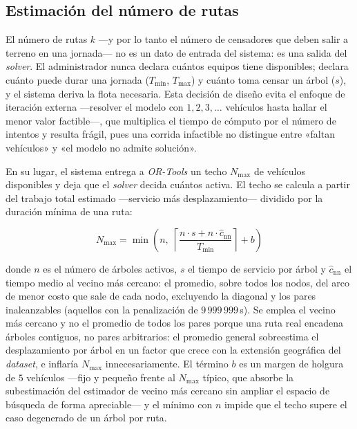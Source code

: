 \subsection{Estimación del número de rutas}

\label{sec:flota}

El número de rutas $k$ ---y por lo tanto el número de censadores que deben salir a
terreno en una jornada--- no es un dato de entrada del sistema: es una salida del
\textit{solver}. El administrador nunca declara cuántos equipos tiene disponibles; declara
cuánto puede durar una jornada ($T_{\min}$, $T_{\max}$) y cuánto toma censar un
árbol ($s$), y el sistema deriva la flota necesaria. Esta decisión de diseño evita
el enfoque de iteración externa ---resolver el modelo con $1, 2, 3, \ldots$
vehículos hasta hallar el menor valor factible---, que multiplica el tiempo de
cómputo por el número de intentos y resulta frágil, pues una corrida infactible no
distingue entre «faltan vehículos» y «el modelo no admite solución».

En su lugar, el sistema entrega a \textit{OR-Tools} un techo $N_{\max}$ de vehículos
disponibles y deja que el \textit{solver} decida cuántos activa. El techo se calcula a partir
del trabajo total estimado ---servicio más desplazamiento--- dividido por la duración
mínima de una ruta:

\begin{equation}
  N_{\max} = \min\!\left(n,\;
  \left\lceil \frac{n \cdot s + n \cdot \hat{c}_{\text{nn}}}{T_{\min}} \right\rceil + b
  \right)
  \label{eq:nmax}
\end{equation}

donde $n$ es el número de árboles activos, $s$ el tiempo de servicio por árbol y
$\hat{c}_{\text{nn}}$ el tiempo medio al vecino más cercano: el promedio,
sobre todos los nodos, del arco de menor costo que sale de cada nodo, excluyendo la
diagonal y los pares inalcanzables (aquellos con la penalización de $9\,999\,999$\,s).
Se emplea el vecino más cercano y no el promedio de todos los pares porque una ruta
real encadena árboles contiguos, no pares arbitrarios: el promedio general
sobreestima el desplazamiento por árbol en un factor que crece con la extensión
geográfica del \textit{dataset}, e inflaría $N_{\max}$ innecesariamente. El término
$b$ es un margen de holgura de $5$ vehículos ---fijo y pequeño frente al $N_{\max}$
típico, que absorbe la subestimación del estimador de vecino más cercano sin ampliar
el espacio de búsqueda de forma apreciable--- y el mínimo con $n$ impide que el
techo supere el caso degenerado de un árbol por ruta.

